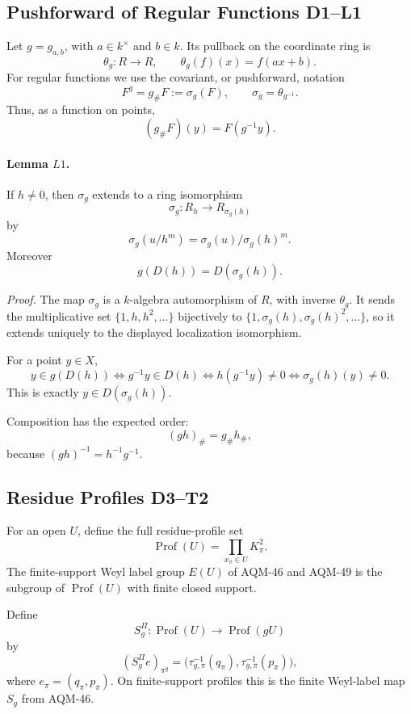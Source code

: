 \subsection{Pushforward of Regular Functions D1--L1}
Let \(g=g_{a,b}\), with \(a\in k^\times\) and \(b\in k\).  Its pullback on the
coordinate ring is
\[
  \theta_g:R\longrightarrow R,\qquad \theta_g(f)(x)=f(ax+b).
\]
For regular functions we use the covariant, or pushforward, notation
\[
  F^g=g_\#F:=\sigma_g(F),\qquad \sigma_g=\theta_{g^{-1}}.
\]
Thus, as a function on points,
\[
  (g_\#F)(y)=F(g^{-1}y).
\]

\paragraph{Lemma \(L1\).}
If \(h\ne0\), then \(\sigma_g\) extends to a ring isomorphism
\[
  \sigma_g:R_h\longrightarrow R_{\sigma_g(h)}
\]
by
\[
  \sigma_g(u/h^m)=\sigma_g(u)/\sigma_g(h)^m.
\]
Moreover
\[
  g(D(h))=D(\sigma_g(h)).
\]

\emph{Proof.}
The map \(\sigma_g\) is a \(k\)-algebra automorphism of \(R\), with inverse
\(\theta_g\).  It sends the multiplicative set
\(\{1,h,h^2,\ldots\}\) bijectively to
\(\{1,\sigma_g(h),\sigma_g(h)^2,\ldots\}\), so it extends uniquely to the
displayed localization isomorphism.

For a point \(y\in X\),
\[
  y\in g(D(h))
  \Longleftrightarrow
  g^{-1}y\in D(h)
  \Longleftrightarrow
  h(g^{-1}y)\ne0
  \Longleftrightarrow
  \sigma_g(h)(y)\ne0.
\]
This is exactly \(y\in D(\sigma_g(h))\).

Composition has the expected order:
\[
  (gh)_\#=g_\#h_\#,
\]
because \((gh)^{-1}=h^{-1}g^{-1}\).

\subsection{Residue Profiles D3--T2}
For an open \(U\), define the full residue-profile set
\[
  \operatorname{Prof}(U)=\prod_{x_\pi\in U}K_\pi^2.
\]
The finite-support Weyl label group \(E(U)\) of AQM-46 and AQM-49 is the
subgroup of \(\operatorname{Prof}(U)\) with finite closed support.

Define
\[
  S_g^\Pi:\operatorname{Prof}(U)\longrightarrow\operatorname{Prof}(gU)
\]
by
\[
  (S_g^\Pi e)_{\pi^g}
  =
  \bigl(\tau_{g,\pi}^{-1}(q_\pi),
        \tau_{g,\pi}^{-1}(p_\pi)\bigr),
\]
where \(e_\pi=(q_\pi,p_\pi)\).  On finite-support profiles this is the
finite Weyl-label map \(S_g\) from AQM-46.

